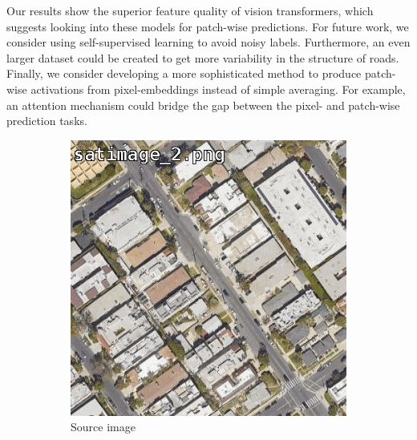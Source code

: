 \documentclass[10pt,conference,compsocconf]{IEEEtran}
\begin{document}
Our results show the superior feature quality of vision transformers, which suggests looking into these models for patch-wise predictions. For future work, we consider using self-supervised learning to avoid noisy labels. Furthermore, an even larger dataset could be created to get more variability in the structure of roads. Finally, we consider developing a more sophisticated method to produce patch-wise activations from pixel-embeddings instead of simple averaging. For example, an attention mechanism could bridge the gap between the pixel- and patch-wise prediction tasks. 

\begin{figure}[h]
\centering
\begin{subfigure}[t]{.25\linewidth}
  \centering
  \includegraphics[width=.9\linewidth]{pictures/eval_image.png}
  \caption{\footnotesize Source image}
  \label{fig:patch_diff_image}
\end{subfigure}%
\begin{subfigure}[t]{.25\linewidth}
  \centering

\end{subfigure}
\end{figure}
\end{document}
